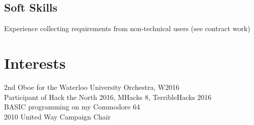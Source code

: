 \documentclass[]{deedy-resume-openfont}
\begin{document}
\begin{minipage}[t]{0.31\textwidth}
\subsection{Soft Skills}
\textbullet{} Experience collecting requirements from non-technical users (see contract work)

\section{Interests}
\textbullet{} 2nd Oboe for the Waterloo University Orchestra, W2016\\
\textbullet{} Participant of Hack the North 2016, MHacks 8, TerribleHacks 2016\\
\textbullet{} BASIC programming on my Commodore 64\\
\textbullet{} 2010 United Way Campaign Chair

%
%

\end{minipage} 
\hfill
\end{document}
